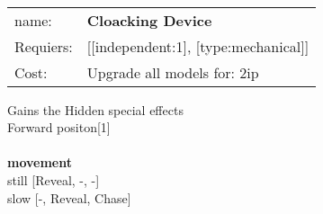 \ \\
\begin{tabular}{ll}
name: & {\bf Cloacking Device } \\
Requiers: & [[independent:1], [type:mechanical]] \\
Cost: & Upgrade all models for: 2ip \\
\end{tabular}

Gains the Hidden special effects\\ 
Forward positon[1]\\ 








\ \\ {\bf movement } \\
still [Reveal, -, -] \\
slow [-, Reveal, Chase] \\

